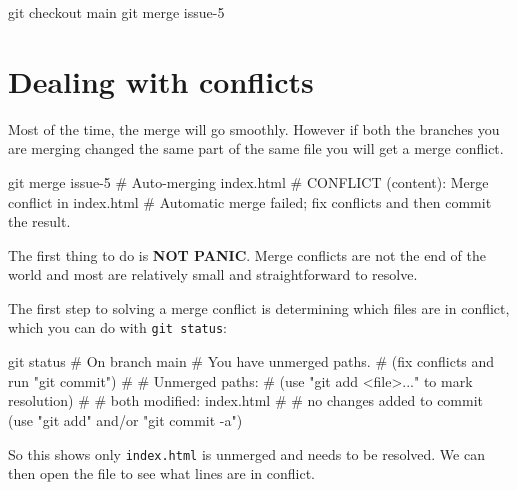 \documentclass[
]{book}
\newenvironment{Shaded}{\begin{snugshade}}{\end{snugshade}}
\newcommand{\NormalTok}[1]{#1}
\begin{document}
\begin{Shaded}
\begin{Highlighting}[]
\NormalTok{git checkout main}
\NormalTok{git merge issue{-}5}
\end{Highlighting}
\end{Shaded}

\section{Dealing with conflicts}\label{dealing-with-conflicts}

Most of the time, the merge will go smoothly.
However if both the branches you are merging changed the same part of the same file you will get a merge conflict.

\begin{Shaded}
\begin{Highlighting}[]
\NormalTok{git merge issue{-}5}
\NormalTok{\# Auto{-}merging index.html}
\NormalTok{\# CONFLICT (content): Merge conflict in index.html}
\NormalTok{\# Automatic merge failed; fix conflicts and then commit the result.}
\end{Highlighting}
\end{Shaded}

The first thing to do is \textbf{NOT PANIC}.
Merge conflicts are not the end of the world and most are relatively small and straightforward to resolve.

The first step to solving a merge conflict is determining which files are in
conflict, which you can do with \texttt{git\ status}:

\begin{Shaded}
\begin{Highlighting}[]
\NormalTok{git status}
\NormalTok{\# On branch main}
\NormalTok{\# You have unmerged paths.}
\NormalTok{\#   (fix conflicts and run "git commit")}
\NormalTok{\# }
\NormalTok{\# Unmerged paths:}
\NormalTok{\#   (use "git add \textless{}file\textgreater{}..." to mark resolution)}
\NormalTok{\# }
\NormalTok{\#     both modified:      index.html}
\NormalTok{\# }
\NormalTok{\# no changes added to commit (use "git add" and/or "git commit {-}a")}
\end{Highlighting}
\end{Shaded}

So this shows only \texttt{index.html} is unmerged and needs to be resolved.
We can then open the file to see what lines are in conflict.
\end{document}
